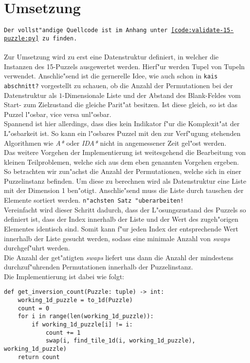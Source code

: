 \section{Umsetzung} %
\label{cha:Umsetzung}
\texttt{Der vollst"andige Quellcode ist im Anhang unter \ref{code:validate-15-puzzle:py} zu finden.}\\\\
Zur Umsetzung wird zu erst eine Datenstruktur definiert, in welcher die Instanzen des 15-Puzzels ausgewertet werden. Hierf"ur werden Tupel von Tupeln verwendet.
Anschlie"send ist die gernerelle Idee, wie auch schon in \texttt{kais abschnitt?} vorgestellt zu schauen, ob die Anzahl der Permutationen bei der Datenstruktur als $1$-Dimensionale Liste und der Abstand des Blank-Feldes vom Start- zum Zielzustand die gleiche Parit"at besitzen.
Ist diese gleich, so ist das Puzzel l"osbar, vice versa unl"osbar.\\
Spannend ist hier allerdings, dass dies kein Indikator f"ur die Komplexit"at der L"osbarkeit ist. So kann ein l"osbares Puzzel mit den zur Verf"ugung stehenden Algorithmen wie \textit{A*} oder \textit{IDA*} nicht in angemessener Zeit gel"ost werden.\\
Das weitere Vorgehen der Implementierung ist weitesgehend die Bearbeitung von kleinen Teilproblemen, welche sich aus dem eben genannten Vorgehen ergeben.\\
So betrachten wir zun"achst die Anzahl der Permutationen, welche sich in einer Puzzelinstanz befinden. Um diese zu berechnen wird als Datenstruktur eine Liste mit der Dimension 1 ben"otigt.
Anschlie"send muss die Liste durch tauschen der Elemente sortiert werden.
\texttt{n"achsten Satz "uberarbeiten!}\\
Vereinfacht wird dieser Schritt dadurch, dass der L"osungszustand des Puzzels so definiert ist, dass der Index innerhalb der Liste und der Wert des zugeh"origen Elementes identisch sind. Somit kann f"ur jeden Index der entsprechende Wert innerhalb der Liste gesucht werden, sodass eine minimale Anzahl von \textit{swaps} durchgef"uhrt werden. \\Die Anzahl der get"atigten \textit{swaps} liefert uns dann die Anzahl der mindestens durchzuf"uhrenden Permutationen innerhalb der Puzzelinstanz.\\
Die Implementierung ist dabei wie folgt:
\begin{verbatim}
def get_inversion_count(Puzzle: tuple) -> int:
    working_1d_puzzle = to_1d(Puzzle)
    count = 0
    for i in range(len(working_1d_puzzle)):
        if working_1d_puzzle[i] != i:
            count += 1
            swap(i, find_tile_1d(i, working_1d_puzzle), working_1d_puzzle)
    return count
\end{verbatim}
